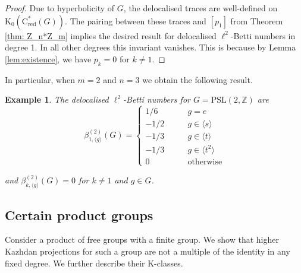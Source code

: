 \documentclass[a4paper,leqno,12pt]{article}
\numberwithin{equation}{section}
\theoremstyle{plain}
\newtheorem{example}[theoremcounter]{Example}
\theoremstyle{definition}
\theoremstyle{remark}
\newcommand{\Csr}{\mathrm{C}^*_{\text{red}}}
\begin{document}
	\begin{proof}
		Due to hyperbolicity of $G$, the delocalised traces are well-defined on $\mathrm {K}_0(\Csr(G))$. The pairing between these traces and $[p_1]$ from Theorem \ref{thm: Z_n*Z_m} implies the desired result for delocalised $\ell^2$-Betti numbers in degree 1. In all other degrees this invariant vanishes. This is because by Lemma \ref{lem:existence}, we have $p_k = 0$ for $k\neq 1$.
	\end{proof}	

	In particular, when $m=2$ and $n=3$ we obtain the following result.	
	
	\begin{example} \label{example: deloc l2 Betti PSL2Z}
		The delocalised $\ell^2$-Betti numbers for $G = \mathrm{PSL}(2, \mathbb Z)$ are
		\begin{equation*}
			\beta^{(2)}_{1, \langle{g}\rangle}(G) = 
			\begin{cases}
				1/6 &\qquad g=e\\
				-1/2  &\qquad g\in \langle{s}\rangle\\
				-1/3  &\qquad g\in \langle{t}\rangle\\
				-1/3  &\qquad g\in \langle{t^2}\rangle\\
				0    &\qquad \text{otherwise} 
			\end{cases}
		\end{equation*}
		
		and $\beta ^{(2)}_{k, \langle{g}\rangle}(G) = 0$ for $k \neq 1$ and $g\in G$.
	\end{example}
	
	
	\subsection{Certain product groups}
	Consider a product of free groups with a finite group. We show that higher Kazhdan projections for such a group are not a multiple of the identity in any fixed degree. We further describe their K-classes. 
	
\end{document}
